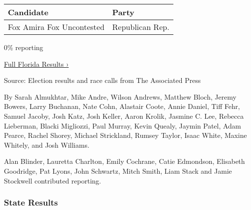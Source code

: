 \begin{longtable}[]{@{}ll@{}}
\toprule
Candidate & Party\tabularnewline
\midrule
\endhead
 Fox Amira Fox Uncontested & Republican Rep.\tabularnewline
\bottomrule
\end{longtable}

0\% reporting

\href{https://www.nytimes3xbfgragh.onion/interactive/2018/11/06/us/elections/results-florida-elections.html}{Full
Florida Results ›}

Source: Election results and race calls from The Associated Press

By Sarah Almukhtar, Mike Andre, Wilson Andrews, Matthew Bloch, Jeremy
Bowers, Larry Buchanan, Nate Cohn, Alastair Coote, Annie Daniel, Tiff
Fehr, Samuel Jacoby, Josh Katz, Josh Keller, Aaron Krolik, Jasmine C.
Lee, Rebecca Lieberman, Blacki Migliozzi, Paul Murray, Kevin Quealy,
Jaymin Patel, Adam Pearce, Rachel Shorey, Michael Strickland, Rumsey
Taylor, Isaac White, Maxine Whitely, and Josh Williams.

Alan Blinder, Lauretta Charlton, Emily Cochrane, Catie Edmondson,
Elisabeth Goodridge, Pat Lyons, John Schwartz, Mitch Smith, Liam Stack
and Jamie Stockwell contributed reporting.

\hypertarget{state-results}{%
\subsubsection{State Results}\label{state-results}}

